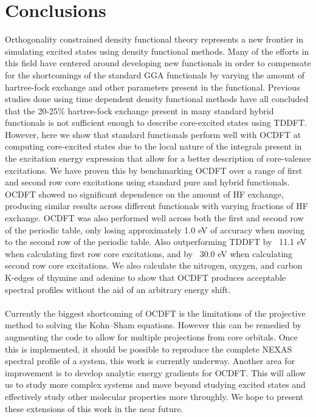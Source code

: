 \documentclass[12pt]{article}
\begin{document}
\section{Conclusions}
Orthogonality constrained density functional theory represents a new frontier in simulating excited states using density functional methods. Many of the efforts in this field have centered around developing new functionals in order to compensate for the shortcomings of the standard GGA functionals by varying the amount of hartree-fock exchange and other parameters present in the functional. Previous studies done using time dependent density functional methods have all concluded that the 20-25\% hartree-fock exchange present in many standard hybrid functionals is not sufficient enough to describe core-excited states using TDDFT. However, here we show that standard functionals perform well with OCDFT at computing core-excited states due to the local nature of the integrals present in the excitation energy expression that allow for a better description of core-valence excitations. We have proven this by benchmarking OCDFT over a range of first and second row core excitations using standard pure and hybrid functionals. OCDFT showed no significant dependence on the amount of HF exchange, producing similar results across different functionals with varying fractions of HF exchange. OCDFT was also performed well across both the first and second row of the periodic table, only losing approximately 1.0 eV of accuracy when moving to the second row of the periodic table. Also outperforming TDDFT by ~11.1 eV when calculating first row core excitations, and by ~30.0 eV when calculating second row core excitations. We also calculate the nitrogen, oxygen, and carbon K-edges of thymine and adenine to show that OCDFT produces acceptable spectral profiles without the aid of an arbitrary energy shift.
\\ \\ 
Currently the biggest shortcoming of OCDFT is the limitations of the projective method to solving the Kohn--Sham equations. However this can be remedied by augmenting the code to allow for multiple projections from core orbitals. Once this is implemented, it should be possible to reproduce the complete NEXAS spectral profile of a system, this work is currently underway. Another area for improvement is to develop analytic energy gradients for OCDFT. This will allow us to study more complex systems and move beyond studying excited states and effectively study other molecular properties more throughly. We hope to present these extensions of this work in the near future.
\footnotesize{
}
\end{document}
